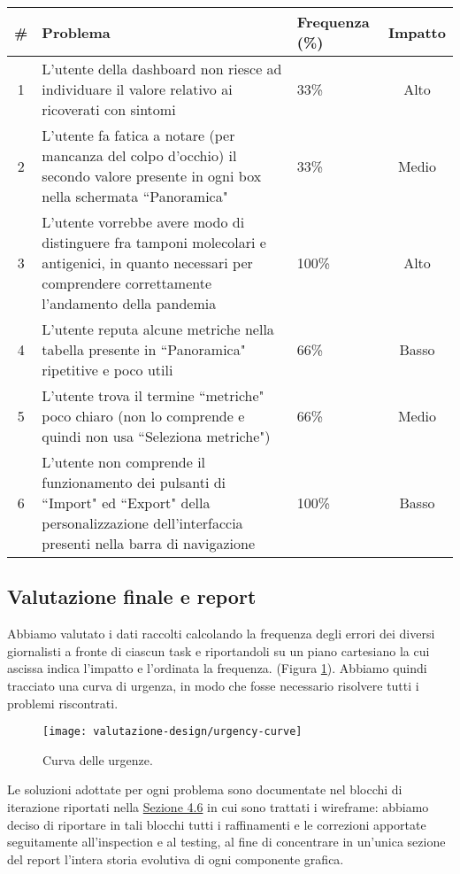 {
\renewcommand{\arraystretch}{2}
\begin{longtable}{|c|p{9cm}|p{3cm}|c|}
    \hline
    \textbf{\#} & \textbf{Problema} & \textbf{Frequenza (\%)} & \textbf{Impatto} \\
    \hline
    \endhead
    1 & L'utente della dashboard non riesce ad individuare il valore relativo ai ricoverati con sintomi & 33\% & Alto \\
    \hline
    2 & L'utente fa fatica a notare (per mancanza del colpo d'occhio) il secondo valore presente in ogni box nella schermata ``Panoramica" & 33\% & Medio \\
    \hline
    3 & L'utente vorrebbe avere modo di distinguere fra tamponi molecolari e antigenici, in quanto necessari per comprendere correttamente l'andamento della pandemia & 100\% & Alto \\
    \hline
    4 & L'utente reputa alcune metriche nella tabella presente in ``Panoramica" ripetitive e poco utili & 66\% & Basso \\
    \hline
    5 & L'utente trova il termine ``metriche" poco chiaro (non lo comprende e quindi non usa ``Seleziona metriche") & 66\% & Medio \\
    \hline
    6 & L'utente non comprende il funzionamento dei pulsanti di ``Import" ed ``Export" della personalizzazione dell'interfaccia presenti nella barra di navigazione & 100\% & Basso \\
    \hline
\end{longtable}
}

\subsection{Valutazione finale e report}
\label{ss:valutazione-finale-report}
Abbiamo valutato i dati raccolti calcolando la frequenza degli errori dei diversi giornalisti a fronte di ciascun task e riportandoli su un piano cartesiano la cui ascissa indica l'impatto e l'ordinata la frequenza. (Figura \ref{fig:testing-urgency-curve}).
Abbiamo quindi tracciato una curva di urgenza, in modo che fosse necessario risolvere tutti i problemi riscontrati.

\begin{figure}[H]
    \centering
    \texttt{[image: valutazione-design/urgency-curve]}
    \caption{Curva delle urgenze.}
    \label{fig:testing-urgency-curve}
\end{figure}
\noindent

Le soluzioni adottate per ogni problema sono documentate nel blocchi di iterazione riportati nella \hyperref[s:wireframe]{Sezione 4.6} in cui sono trattati i wireframe: abbiamo deciso di riportare in tali blocchi tutti i raffinamenti e le correzioni apportate seguitamente all'inspection e al testing, al fine di concentrare in un'unica sezione del report l'intera storia evolutiva di ogni componente grafica.